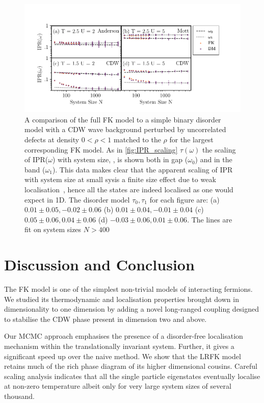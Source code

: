 \hypertarget{fig:DM_IPR_scaling}{%
\begin{figure}
\centering
\includegraphics[width=1\textwidth,height=\textheight]{figure_code/fk_chapter/disorder_model/DM_IPR_scaling}
\caption[{FK model compared to binary disorder model: IPR Scaling}]{A comparison of the full FK model to a simple binary disorder model with a CDW wave background perturbed by uncorrelated defects at density \(0 < \rho < 1\) matched to the \(\rho\) for the largest corresponding FK model. As in \cref{fig:IPR_scaling} \(\tau(\omega)\) the scaling of IPR(\(\omega\)) with system size, , is shown both in gap (\(\omega_0\)) and in the band (\(\omega_1\)). This data makes clear that the apparent scaling of IPR with system size at small sysis a finite size effect due to weak localisation~\autocite{antipovInteractionTunedAndersonMott2016}, hence all the states are indeed localised as one would expect in 1D. The disorder model \(\tau_0,\tau_1\) for each figure are: (a) \(0.01\pm0.05, -0.02\pm0.06\) (b) \(0.01\pm0.04, -0.01\pm0.04\) (c) \(0.05\pm0.06, 0.04\pm0.06\) (d) \(-0.03\pm0.06, 0.01\pm0.06\). The lines are fit on system sizes \(N > 400\)}
\label{fig:DM_IPR_scaling}
\end{figure}
}

\hypertarget{fk-conclusion}{%
\section{Discussion and Conclusion}\label{fk-conclusion}}

The FK model is one of the simplest non-trivial models of interacting fermions. We studied its thermodynamic and localisation properties brought down in dimensionality to one dimension by adding a novel long-ranged coupling designed to stabilise the CDW phase present in dimension two and above.

Our MCMC approach emphasises the presence of a disorder-free localisation mechanism within the translationally invariant system. Further, it gives a significant speed up over the naive method. We show that the LRFK model retains much of the rich phase diagram of its higher dimensional cousins. Careful scaling analysis indicates that all the single particle eigenstates eventually localise at non-zero temperature albeit only for very large system sizes of several thousand.

